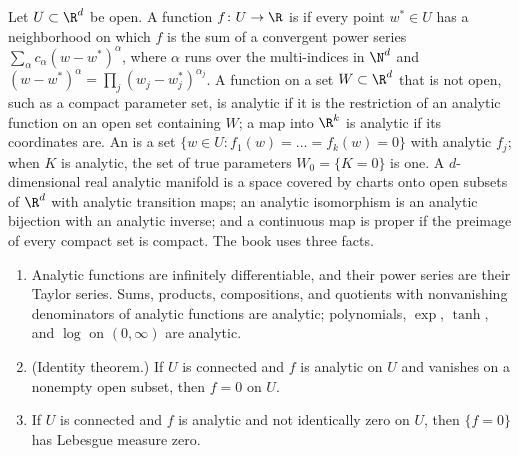 \begin{refsection}
\begin{definition}\label{def:toolkit:analytic}
Let $U\subset\R^d$ be open. A function $f\colon U\to\R$ is  if every point $w^*\in U$ has a neighborhood on which $f$ is the sum of a convergent power series $\sum_\alpha c_\alpha(w-w^*)^\alpha$, where $\alpha$ runs over the multi-indices in $\N^d$ and $(w-w^*)^\alpha=\prod_j(w_j-w^*_j)^{\alpha_j}$. A function on a set $W\subset\R^d$ that is not open, such as a compact parameter set, is analytic if it is the restriction of an analytic function on an open set containing $W$; a map into $\R^k$ is analytic if its coordinates are. An  is a set $\{w\in U:f_1(w)=\dots=f_k(w)=0\}$ with analytic $f_j$; when $K$ is analytic, the set of true parameters $W_0=\{K=0\}$ is one. A $d$-dimensional real analytic manifold is a space covered by charts onto open subsets of $\R^d$ with analytic transition maps; an analytic isomorphism is an analytic bijection with an analytic inverse; and a continuous map is proper if the preimage of every compact set is compact. The book uses three facts.
\begin{enumerate}
\item Analytic functions are infinitely differentiable, and their power series are their Taylor series. Sums, products, compositions, and quotients with nonvanishing denominators of analytic functions are analytic; polynomials, $\exp$, $\tanh$, and $\log$ on $(0,\infty)$ are analytic.
\item (Identity theorem.) If $U$ is connected and $f$ is analytic on $U$ and vanishes on a nonempty open subset, then $f=0$ on $U$.
\item If $U$ is connected and $f$ is analytic and not identically zero on $U$, then $\{f=0\}$ has Lebesgue measure zero.
\end{enumerate}
\end{definition}


\end{refsection}
